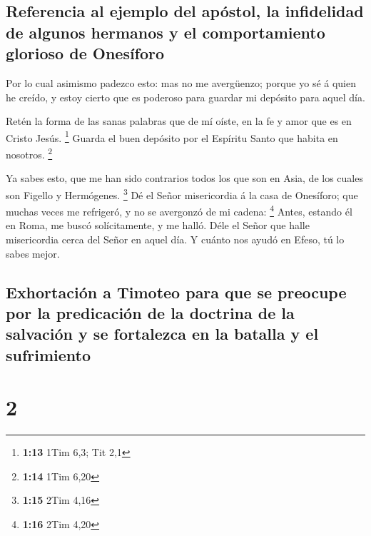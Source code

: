 \hypertarget{referencia-al-ejemplo-del-apuxf3stol-la-infidelidad-de-algunos-hermanos-y-el-comportamiento-glorioso-de-onesuxedforo}{%
\subsection{Referencia al ejemplo del apóstol, la infidelidad de algunos
hermanos y el comportamiento glorioso de
Onesíforo}\label{referencia-al-ejemplo-del-apuxf3stol-la-infidelidad-de-algunos-hermanos-y-el-comportamiento-glorioso-de-onesuxedforo}}

 Por lo cual asimismo padezco esto: mas no me avergüenzo;
porque yo sé á quien he creído, y estoy cierto que es poderoso para
guardar mi depósito para aquel día.

 Retén la forma de las sanas palabras que de mí oíste, en
la fe y amor que es en Cristo Jesús. \footnote{\textbf{1:13} 1Tim 6,3;
  Tit 2,1}  Guarda el buen depósito por el Espíritu Santo
que habita en nosotros. \footnote{\textbf{1:14} 1Tim 6,20}

 Ya sabes esto, que me han sido contrarios todos los que
son en Asia, de los cuales son Figello y Hermógenes. \footnote{\textbf{1:15}
  2Tim 4,16}  Dé el Señor misericordia á la casa de
Onesíforo; que muchas veces me refrigeró, y no se avergonzó de mi
cadena: \footnote{\textbf{1:16} 2Tim 4,20}  Antes, estando
él en Roma, me buscó solícitamente, y me halló.  Déle el
Señor que halle misericordia cerca del Señor en aquel día. Y cuánto nos
ayudó en Efeso, tú lo sabes mejor.

\hypertarget{exhortaciuxf3n-a-timoteo-para-que-se-preocupe-por-la-predicaciuxf3n-de-la-doctrina-de-la-salvaciuxf3n-y-se-fortalezca-en-la-batalla-y-el-sufrimiento}{%
\subsection{Exhortación a Timoteo para que se preocupe por la
predicación de la doctrina de la salvación y se fortalezca en la batalla
y el
sufrimiento}\label{exhortaciuxf3n-a-timoteo-para-que-se-preocupe-por-la-predicaciuxf3n-de-la-doctrina-de-la-salvaciuxf3n-y-se-fortalezca-en-la-batalla-y-el-sufrimiento}}

\hypertarget{section-1}{%
\section{2}\label{section-1}}

